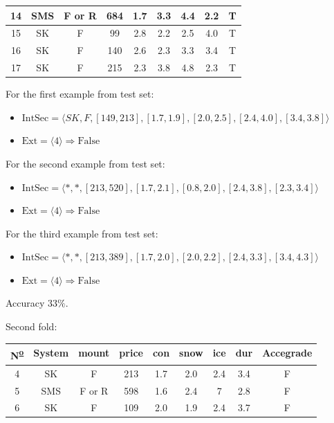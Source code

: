 \documentclass[12pt]{report}
\begin{document}
\begin{solution}
\begin{enumerate}
\begin{table}[H]
\begin{tabular}{|c|c|c|c|c|c|c|c|c|}
          14 & SMS    & F or R & 684   & 1.7 & 3.3  & 4.4 & 2.2 & T         \\ \hline
          15 & SK     & F      & 99    & 2.8 & 2.2  & 2.5 & 4.0 & T         \\ \hline
          16 & SK     & F      & 140   & 2.6 & 2.3  & 3.3 & 3.4 & T         \\ \hline
          17 & SK     & F      & 215   & 2.3 & 3.8  & 4.8 & 2.3 & T         \\ \hline
          \end{tabular}
          \end{table}
    For the first example from test set:
    \begin{itemize}
      \item $\text{IntSec} = \langle SK, F, [149, 213], [1.7, 1.9], [2.0, 2.5], [2.4, 4.0], [3.4, 3.8] \rangle$
      \item $\text{Ext} = \langle 4 \rangle \Longrightarrow \text{False}$
    \end{itemize}
    For the second example from test set:
    \begin{itemize}
      \item $\text{IntSec} = \langle *, *, [213, 520], [1.7, 2.1], [0.8, 2.0], [2.4, 3.8], [2.3, 3.4] \rangle$
      \item $\text{Ext} = \langle 4  \rangle \Longrightarrow \text{False}$
    \end{itemize}
    For the third example from test set:
    \begin{itemize}
      \item $\text{IntSec} = \langle *, *, [ 213, 389], [1.7, 2.0], [2.0, 2.2], [2.4, 3.3], [3.4, 4.3] \rangle$
      \item $\text{Ext} = \langle 4 \rangle \Longrightarrow \text{False}$
    \end{itemize}
    Accuracy $33\%$.
    \par
    Second fold:
    \begin{table}[H]
      \centering
      \begin{tabular}{|c|c|c|c|c|c|c|c|c|}
      \hline
      N\textsuperscript{\underline{o}} & System & mount  & price & con & snow & ice & dur & Accegrade \\ \hline
      4 & SK     & F      & 213   & 1.7 & 2.0  & 2.4 & 3.4 & F         \\ \hline
      5 & SMS    & F or R & 598   & 1.6 & 2.4  & 7   & 2.8 & F         \\ \hline
      6 & SK     & F      & 109   & 2.0 & 1.9  & 2.4 & 3.7 & F         \\ \hline

\end{tabular}
\end{table}
\end{enumerate}
\end{solution}
\end{document}
